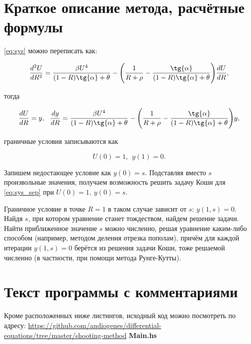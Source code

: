 \documentclass[a4paper,12pt]{article}
\begin{document}
\section{\normalsize{Краткое описание метода, расчётные формулы}}
\begin{flushleft}
  \eqref{eq:sys} можно переписать как:

  \begin{equation}\label{eq:sys_same}
    \frac{d^2U}{dR^2} = \frac{\beta U^4}{(1-R)\tg{\alpha}+\theta} - \Bigg(\frac{1}{R + \rho} - \frac{\tg{\alpha}}{(1-R)\tg{\alpha} + \theta}\Bigg)\frac{dU}{dR},
  \end{equation}
  
  тогда

  \begin{equation}\label{eq:sys_sep}
    \frac{dU}{dR} = y,~~\frac{dy}{dR} = \frac{\beta U^4}{(1-R)\tg{\alpha}+\theta} - \Bigg(\frac{1}{R + \rho} - \frac{\tg{\alpha}}{(1-R)\tg{\alpha} + \theta}\Bigg)y,
  \end{equation}

  граничные условия записываются как

  \begin{equation}\label{eq:cond_sep}
    U(0) = 1,~~y(1) = 0.
  \end{equation}

  Запишем недостающее условие как \(y(0) = s\). Подставляя вместо $s$ произвольные значения, получаем возможность решить задачу Коши для \eqref{eq:sys_sep}
  при \(U(0) = 1,~y(0) = s\).\linebreak

  Граничное условие в точке $R=1$ в таком случае зависит от $s$: $y(1,s) = 0$. Найдя $s$, при котором уравнение станет тождеством, найдем решение задачи.
  \linebreak\linebreak
  Найти приближенное значение $s$ можно численно, решая уравнение каким-либо способом (например, методом деления отрезка пополам), причём для каждой итерации
  $y(1,s) = 0$ берётся из решения задачи Коши, тоже решаемой численно (в частности, при помощи метода Рунге-Кутты).
\end{flushleft}


\section{\normalsize{Текст программы с комментариями}}
Кроме расположенных ниже листингов, исходный код можно посмотреть по адресу: \url{https://github.com/andiogenes/differential-equations/tree/master/shooting-method}
\linebreak\linebreak\textbf{Main.hs}
\inputminted[breaklines]{haskell}{../app/Main.hs}
\end{document}
